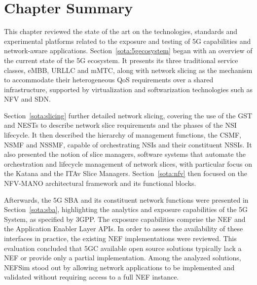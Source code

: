 \section{Chapter Summary}
\label{chap:sota:summary}

This chapter reviewed the state of the art on the technologies, standards and experimental platforms related to the exposure and testing of \acs{5G} capabilities and network-aware applications. Section~\ref{sota:5gecosystem} began with an overview of the current state of the \acs{5G} ecosystem. It presents its three traditional service classes, \acs{eMBB}, \acs{URLLC} and \acs{mMTC}, along with network slicing as the mechanism to accommodate their heterogeneous \acs{QoS} requirements over a shared infrastructure, supported by virtualization and softwarization technologies such as \acs{NFV} and \acs{SDN}.

Section~\ref{sota:slicing} further detailed network slicing, covering the use of the \acs{GST} and \acsp{NEST} to describe network slice requirements and the phases of the \acs{NSI} lifecycle. It then described the hierarchy of management functions, the \acs{CSMF}, \acs{NSMF} and \acs{NSSMF}, capable of orchestrating \acsp{NSI} and their constituent \acsp{NSSI}. It also presented the notion of slice managers, software systems that automate the orchestration and lifecycle management of network slices, with particular focus on the Katana and the \acs{ITAv} Slice Managers. Section~\ref{sota:nfv} then focused on the \acs{NFV-MANO} architectural framework and its functional blocks.

Afterwards, the \acs{5G} \acs{SBA} and its constituent network functions were presented in Section~\ref{sota:sba}, highlighting the analytics and exposure capabilities of the \acs{5G} System, as specified by \acs{3GPP}. The exposure capabilities comprise the \acs{NEF} and the Application Enabler Layer \acsp{API}. In order to assess the availability of these interfaces in practice, the existing \acs{NEF} implementations were reviewed. This evaluation concluded that \acs{5GC} available open source solutions typically lack a \acs{NEF} or provide only a partial implementation. Among the analyzed solutions, \acs{NEF}Sim stood out by allowing network applications to be implemented and validated without requiring access to a full \acs{NEF} instance.

